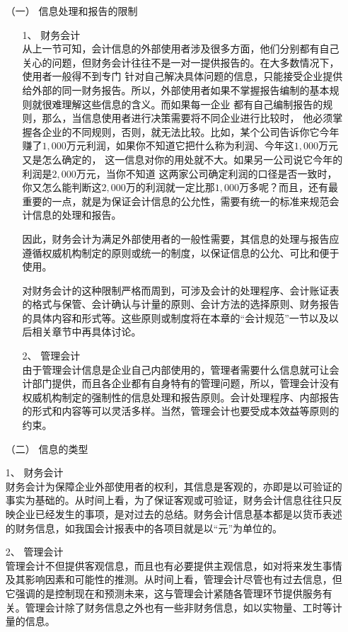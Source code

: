 		\begin{enumerate}
			\item[（一）] 信息处理和报告的限制
				\begin{enumerate}
					\item[1、] 财务会计 \\
						从上一节可知，会计信息的外部使用者涉及很多方面，他们分别都有自己关心的问题，但财务会计往往不是一对一提供报告的。在大多数情况下，使用者一般得不到专门 针对自己解决具体问题的信息，只能接受企业提供给外部的同一财务报告。所以，外部使用者如果不掌握报告编制的基本规则就很难理解这些信息的含义。而如果每一企业 都有自己编制报告的规则，那么，当信息使用者进行决策需要将不同企业进行比较时， 他必须掌握各企业的不同规则，否则，就无法比较。比如，某个公司告诉你它今年赚了$1,000$万元利润，如果你不知道它把什么称为利润、今年这$1,000$万元又是怎么确定的， 这一信息对你的用处就不大。如果另一公司说它今年的利润是$2,000$万元，当你不知道 这两家公司确定利润的口径是否一致时，你又怎么能判断这$2,000$万的利润就一定比那$1,000$万多呢？而且，还有最重要的一点，就是为保证会计信息的公允性，需要有统一的标准来规范会计信息的处理和报告。
						
						因此，财务会计为满足外部使用者的一般性需要，其信息的处理与报告应遵循权威机构制定的原则或统一的制度，以保证信息的公允、可比和便于使用。
						
						对财务会计的这种限制严格而周到，可涉及会计的处理程序、会计账证表的格式与保管、会计确认与计量的原则、会计方法的选择原则、财务报告的具体内容和形式等。这些原则或制度将在本章的“会计规范”一节以及以后相关章节中再具体讨论。
					\item[2、] 管理会计 \\
						由于管理会计信息是企业自己内部使用的，管理者需要什么信息就可让会计部门提供，而且各企业都有自身特有的管理问题，所以，管理会计没有权威机构制定的强制性的信息处理和报告原则。会计处理程序、内部报告的形式和内容等可以灵活多样。当然，管理会计也要受成本效益等原则的约束。
				\end{enumerate}
			\item[（二）] 信息的类型
				\item[1、] 财务会计 \\
					财务会计为保障企业外部使用者的权利，其信息是客观的，亦即是以可验证的事实为基础的。从时间上看，为了保证客观或可验证，财务会计信息往往只反映企业已经发生的事项，是对过去的总结。财务会计信息基本都是以货币表述的财务信息，如我国会计报表中的各项目就是以“元”为单位的。
				\item[2、] 管理会计 \\
					管理会计不但提供客观信息，而且也有必要提供主观信息，如对将来发生事情及其影响因素和可能性的推测。从时间上看，管理会计尽管也有过去信息，但它强调的是控制现在和预测未来，这与管理会计紧随各管理环节提供服务有关。管理会计除了财务信息之外也有一些非财务信息，如以实物量、工时等计量的信息。
					

\end{enumerate}
